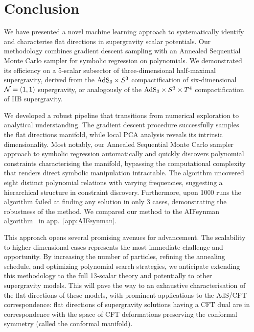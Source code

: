 \documentclass[11pt,a4paper]{article}
\begin{document}
\section{Conclusion} \label{sec:ccl}
We have presented a novel machine learning approach to systematically identify and characterise flat directions in supergravity scalar potentials. Our methodology combines gradient descent sampling with an Annealed Sequential Monte Carlo sampler for symbolic regression on polynomials. We demonstrated its efficiency on a 5-scalar subsector of three-dimensional half-maximal supergravity, derived from the ${\rm AdS}_3 \times S^3$ compactification of six-dimensional ${\cal N}=(1,1)$ supergravity, or analogously of the ${\rm AdS}_3 \times S^3 \times T^4$ compactification of IIB supergravity.

We developed a robust pipeline that transitions from numerical exploration to analytical understanding. The gradient descent procedure successfully samples the flat directions manifold, while local PCA analysis reveals its intrinsic dimensionality. Most notably, our Annealed Sequential Monte Carlo sampler approach to symbolic regression automatically and quickly discovers polynomial constraints characterising the manifold, bypassing the computational complexity that renders direct symbolic manipulation intractable. The algorithm uncovered eight distinct polynomial relations with varying frequencies, suggesting a hierarchical structure in constraint discovery. Furthermore, upon 1000 runs the algorithm failed at finding any solution in only 3 cases, demonstrating the robustness of the method. We compared our method to the AIFeynman algorithm~\cite{Udrescu:2019mnk} in app.~\ref{app:AIFeynman}.

This approach opens several promising avenues for advancement. The scalability to higher-dimensional cases represents the most immediate challenge and opportunity. By increasing the number of particles, refining the annealing schedule, and optimizing polynomial search strategies, we anticipate extending this methodology to the full 13-scalar theory and potentially to other supergravity models. This will pave the way to an exhaustive characterisation of the flat directions of these models, with prominent applications to the AdS/CFT correspondence: flat directions of supergravity solutions having a CFT dual are in correspondence with the space of CFT deformations preserving the conformal symmetry (called the conformal manifold). 

\end{document}

